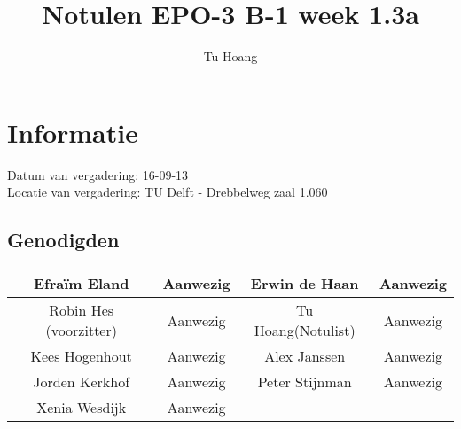 \documentclass{article}
\begin{document}
\title{Notulen EPO-3 B-1 week 1.3a }%
\author{Tu Hoang}%
\maketitle

\section*{Informatie}
Datum van vergadering: 16-09-13\\ %
Locatie van vergadering: TU Delft - Drebbelweg zaal 1.060 %
\subsection*{Genodigden}
\begin{center}
\begin{tabular}{|c |c | c| c|}
	\hline
Efraïm Eland & Aanwezig & Erwin de Haan & Aanwezig \\
	\hline
Robin Hes (voorzitter) & Aanwezig & Tu Hoang(Notulist) & Aanwezig \\
	\hline
Kees Hogenhout & Aanwezig & Alex Janssen & Aanwezig\\
	\hline
Jorden Kerkhof & Aanwezig & Peter Stijnman & Aanwezig \\
	\hline
Xenia Wesdijk & Aanwezig & & \\
	\hline
\end{tabular}
\end{center}
\end{document}
